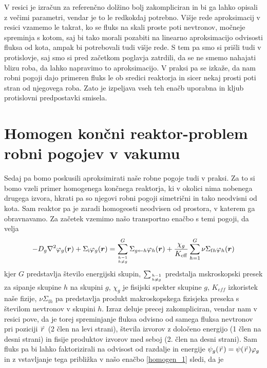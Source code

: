 \documentclass[slovene,11pt,a4paper]{article}
\def\phi{\varphi}
\renewcommand{\vec}[1]{\overset{\smash{\hbox{\raise -0.42ex\hbox{$\scriptscriptstyle\rightharpoonup$}}}}{#1}}
\begin{document}
V resici je izračun za referenčno dolžino bolj zakompliciran in bi ga lahko opisali z večimi parametri, vendar je to le redkokdaj potrebno. Višje rede aproksimacij v resici vzamemo le takrat, ko se fluks na skali proste poti nevtronov, močneje spreminja s kotom, saj bi tako morali pozabiti na linearno aproksimacijo odvisosti fluksa od kota, ampak bi potrebovali tudi višje rede. S tem pa smo si prišli tudi v protislovje, saj smo si pred začetkom poglavja zatrdili, da se ne smemo nahajati blizu roba, da lahko napravimo to aproksimacijo. V praksi pa se izkaže, da nam robni pogoji dajo primeren fluks le ob sredici reaktorja in sicer nekaj prosti poti stran od njegovega roba. Zato je izpeljava vseh teh enačb uporabna in kljub protislovni predpostavki smisela. \cite{Uvod}

\section{Homogen končni reaktor-problem robni pogojev v vakumu}
Sedaj pa bomo poskusili aproksimirati naše robne pogoje tudi v praksi. Za to si bomo vzeli primer homogenega končnega reaktorja, ki v okolici nima nobenega drugega izvora, hkrati pa so njegovi robni pogoji simetrični in tako neodvisni od kota. Sam reaktor pa je zaradi homogeosti neodvisen od prostora, v katerem ga obravnavamo. 
Za začetek vzemimo našo transportno enačbo s temi pogoji, da velja
\begin{equation}
-D_{g} \nabla^{2} \phi_{g}(\boldsymbol{r})+\Sigma_{\mathrm{i}} \phi_{g}(\boldsymbol{r})=\sum_{h-1 \atop h \neq g}^{G} \Sigma_{g \leftarrow h} \phi_{h}(\boldsymbol{r})+\frac{\chi_{g}}{K_{\mathrm{eff}}} \sum_{h=1}^{G} \nu \Sigma_{\mathrm{f} h} \phi_{h}(\boldsymbol{r})
\label{homogen_1}
\end{equation}
kjer $G$ predstavlja število energijski skupin, $\sum_{h-1 \atop h \neq g}$ predstalja mskroskopski presek za sipanje skupine $h$ na skupini $g$, $\chi_{g}$ je fisijski spekter skupine $g$, $K_{eff}$ izkoristek naše fizije, $\nu \Sigma_{\mathrm{f} h}$ pa predstavlja produkt makroskopskega fizisjeka preseka s številom nevtronov v skupini $h$. Izraz deluje precej zakompliciran, vendar nam v resici pove, da je torej spreminjanje fluksa odvisno od samega fluksa nevtronov pri poziciji $\vec{r}$ (2 člen na levi strani), števila izvorov z določeno energijo (1 člen na desni strani) in fisije produktov izvorov med seboj (2. člen na desni strani). Sam fluks pa bi lahko faktorizirali na odvisost od razdalje in energije $\psi_g(\vec{r})=\psi(\vec{r})\phi_g$ in z vstavljanje tega približka v našo enačbo \eqref{homogen_1} sledi, da je
\end{document}
